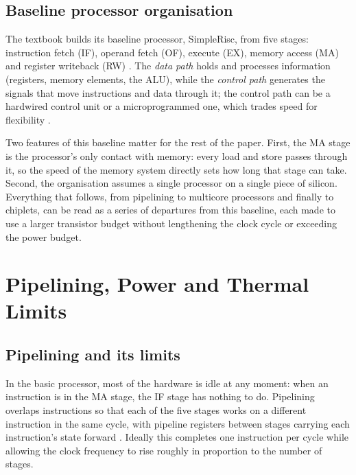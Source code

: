 \subsection{Baseline processor organisation}
The textbook builds its baseline processor, SimpleRisc, from five stages: instruction fetch (IF), operand fetch (OF), execute (EX), memory access (MA) and register writeback (RW) \cite[sec.~9.9.1]{sarangi2025basic}. The \emph{data path} holds and processes information (registers, memory elements, the ALU), while the \emph{control path} generates the signals that move instructions and data through it; the control path can be a hardwired control unit or a microprogrammed one, which trades speed for flexibility \cite[secs.~9.2--9.8]{sarangi2025basic}.

Two features of this baseline matter for the rest of the paper. First, the MA stage is the processor's only contact with memory: every load and store passes through it, so the speed of the memory system directly sets how long that stage can take. Second, the organisation assumes a single processor on a single piece of silicon. Everything that follows, from pipelining to multicore processors and finally to chiplets, can be read as a series of departures from this baseline, each made to use a larger transistor budget without lengthening the clock cycle or exceeding the power budget.

\section{Pipelining, Power and Thermal Limits}
\label{sec:pipelining-power}

\subsection{Pipelining and its limits}
In the basic processor, most of the hardware is idle at any moment: when an instruction is in the MA stage, the IF stage has nothing to do. Pipelining overlaps instructions so that each of the five stages works on a different instruction in the same cycle, with pipeline registers between stages carrying each instruction's state forward \cite[sec.~10.12.1]{sarangi2025basic}. Ideally this completes one instruction per cycle while allowing the clock frequency to rise roughly in proportion to the number of stages.

